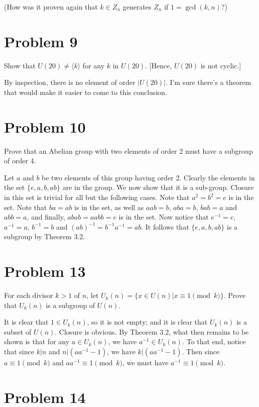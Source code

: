 \documentclass[12pt]{article}
\begin{document}
(How was it proven again that $k\in Z_n$ generates $Z_n$ if $1=\gcd(k,n)$?)

\section*{Problem 9}

Show that $U(20)\neq\langle k\rangle$ for any $k$ in $U(20)$.  [Hence, $U(20)$ is not cyclic.]

By inspection, there is no element of order $|U(20)|$.  I'm sure there's a theorem that would
make it easier to come to this conclusion.

\section*{Problem 10}

Prove that an Abelian group with two elements of order 2 must have a subgroup of order 4.

Let $a$ and $b$ be two elements of this group having order 2.
Clearly the elements in the set $\{e,a,b,ab\}$ are in the group.
We now show that it is a sub-group.  Closure in this set is trivial for
all but the following cases.  Note that $a^2=b^2=e$ is in the set.
Note that $ba=ab$ is in the set, as well as $aab=b$, $aba=b$,
$bab=a$ and $abb=a$, and finally, $abab=aabb=e$ is in the set.
Now notice that $e^{-1}=e$, $a^{-1}=a$, $b^{-1}=b$ and $(ab)^{-1}=b^{-1}a^{-1}=ab$.
It follows that $\{e,a,b,ab\}$ is a subgroup by Theorem 3.2.

\section*{Problem 13}

For each divisor $k>1$ of $n$, let $U_k(n)=\{x\in U(n)|x\equiv 1\pmod k\}$.
Prove that $U_k(n)$ is a subgroup of $U(n)$.

It is clear that $1\in U_k(n)$, so it is not empty; and it is clear that $U_k(n)$ is a subset of $U(n)$.
Closure is obvious.  By Theorem 3.2, what then remains to be shown is that for any $a\in U_k(n)$,
we have $a^{-1}\in U_k(n)$.  To that end, notice that since $k|n$ and $n|(aa^{-1}-1)$,
we have $k|(aa^{-1}-1)$.  Then since $a\equiv 1\pmod k$ and $aa^{-1}\equiv 1\pmod k$,
we must have $a^{-1}\equiv 1\pmod k$.

\section*{Problem 14}
\end{document}
